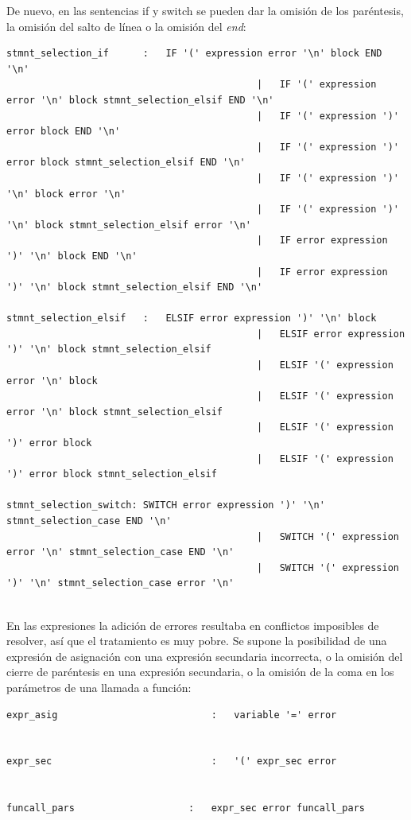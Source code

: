 \documentclass[a4paper,10pt]{article}
\begin{document}
De nuevo, en las sentencias if y switch se pueden dar la omisión de los paréntesis, la omisión del salto de línea o la omisión del \textit{end}:
\begin{lstlisting}
stmnt_selection_if		:	IF '(' expression error '\n' block END '\n'
											|	IF '(' expression error '\n' block stmnt_selection_elsif END '\n'
											|	IF '(' expression ')' error block END '\n'
											|	IF '(' expression ')' error block stmnt_selection_elsif END '\n'
											|	IF '(' expression ')' '\n' block error '\n'
											|	IF '(' expression ')' '\n' block stmnt_selection_elsif error '\n'
											|	IF error expression ')' '\n' block END '\n'
											|	IF error expression ')' '\n' block stmnt_selection_elsif END '\n'

stmnt_selection_elsif	:	ELSIF error expression ')' '\n' block
											|	ELSIF error expression ')' '\n' block stmnt_selection_elsif
											|	ELSIF '(' expression error '\n' block
											|	ELSIF '(' expression error '\n' block stmnt_selection_elsif
											|	ELSIF '(' expression ')' error block
											|	ELSIF '(' expression ')' error block stmnt_selection_elsif

stmnt_selection_switch:	SWITCH error expression ')' '\n' stmnt_selection_case END '\n'
											|	SWITCH '(' expression error '\n' stmnt_selection_case END '\n'
											|	SWITCH '(' expression ')' '\n' stmnt_selection_case error '\n'
									
\end{lstlisting}

En las expresiones la adición de errores resultaba en conflictos imposibles de resolver, así que el tratamiento es muy pobre. Se supone la posibilidad de una expresión de asignación con una expresión secundaria incorrecta, o la omisión del cierre de paréntesis en una expresión secundaria, o la omisión de la coma en los parámetros de una llamada a función:

\begin{lstlisting}
expr_asig							:	variable '=' error 

											
expr_sec							:	'(' expr_sec error 

											
funcall_pars					:	expr_sec error funcall_pars 
\end{lstlisting}
\end{document}

